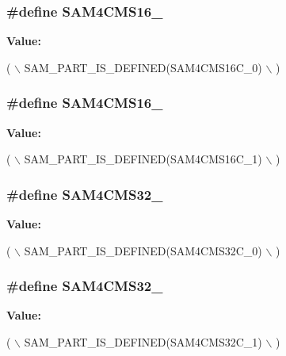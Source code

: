 \subsubsection[{S\+A\+M4\+C\+M\+S16\+\_\+0}]{\setlength{\rightskip}{0pt plus 5cm}\#define S\+A\+M4\+C\+M\+S16\+\_}\label{group__sam__part__macros__group_ga7939b0b91125cd9bd2c327d271599014}
{\bfseries Value\+:}
\begin{DoxyCode}
( \(\backslash\)
        SAM\_PART\_IS\_DEFINED(SAM4CMS16C\_0) \(\backslash\)
        )
\end{DoxyCode}
\hypertarget{group__sam__part__macros__group_gaf4031be5e4d4319df37b6d2f536641cd}{}
\subsubsection[{S\+A\+M4\+C\+M\+S16\+\_\+1}]{\setlength{\rightskip}{0pt plus 5cm}\#define S\+A\+M4\+C\+M\+S16\+\_}\label{group__sam__part__macros__group_gaf4031be5e4d4319df37b6d2f536641cd}
{\bfseries Value\+:}
\begin{DoxyCode}
( \(\backslash\)
        SAM\_PART\_IS\_DEFINED(SAM4CMS16C\_1) \(\backslash\)
        )
\end{DoxyCode}
\hypertarget{group__sam__part__macros__group_gaaaf9613986a1e170c45e4ff09e82cf7a}{}
\subsubsection[{S\+A\+M4\+C\+M\+S32\+\_\+0}]{\setlength{\rightskip}{0pt plus 5cm}\#define S\+A\+M4\+C\+M\+S32\+\_}\label{group__sam__part__macros__group_gaaaf9613986a1e170c45e4ff09e82cf7a}
{\bfseries Value\+:}
\begin{DoxyCode}
( \(\backslash\)
        SAM\_PART\_IS\_DEFINED(SAM4CMS32C\_0) \(\backslash\)
        )
\end{DoxyCode}
\hypertarget{group__sam__part__macros__group_ga98bb5faae6dcd2b14cfa555d19895fa6}{}
\subsubsection[{S\+A\+M4\+C\+M\+S32\+\_\+1}]{\setlength{\rightskip}{0pt plus 5cm}\#define S\+A\+M4\+C\+M\+S32\+\_}\label{group__sam__part__macros__group_ga98bb5faae6dcd2b14cfa555d19895fa6}
{\bfseries Value\+:}
\begin{DoxyCode}
( \(\backslash\)
        SAM\_PART\_IS\_DEFINED(SAM4CMS32C\_1) \(\backslash\)
        )
\end{DoxyCode}
\hypertarget{group__sam__part__macros__group_gac5948c5b98244c8de9c1eeab81f04f35}{}
